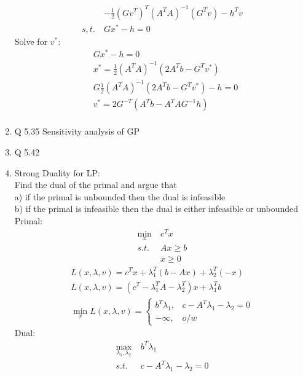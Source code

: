 \documentclass[12pt,letter]{article}
\begin{document}
\begin{enumerate}
\begin{align*}
    &-\frac{1}{2}(Gv^T)^T(A^TA)^{-1}(G^Tv) -h^Tv\\
    s,t.\ & Gx^*-h=0
  \end{align*}
  Solve for $v^*$:\\
  \begin{align*}
    &Gx^*-h=0\\
    &x^* = \frac{1}{2}(A^TA)^{-1}(2A^Tb - G^Tv^*)\\
    &G\frac{1}{2}(A^TA)^{-1}(2A^Tb - G^Tv^*)-h=0\\
    &v^*=2G^{-T}(A^Tb-A^TAG^{-1}h)\\
  \end{align*}
  \pagebreak
\item Q 5.35 Sensitivity analysis of GP\\
  \pagebreak
\item Q 5.42 \\
  \pagebreak
\item Strong Duality for LP:\\
  Find the dual of the primal and argue that \\
  a) if the primal is unbounded then the dual is infeasible\\
  b) if the primal is infeasible then the dual is either infeasible or unbounded\\
  
  Primal:
  \begin{align*}
    \min_x\ & c^Tx\\
    s.t.\ & Ax \geq b\\
           & x \geq 0
  \end{align*}
  \begin{align*}
    L(x,\lambda,v) = c^Tx + \lambda_1^T(b-Ax) + \lambda_2^T(-x)\\
    L(x,\lambda,v) = (c^T-\lambda_1^TA -\lambda_2^T)x + \lambda_1^Tb\\
    \min_x L(x,\lambda,v) =
    \begin{cases}
      b^T\lambda_1, & c -A^T\lambda_1-\lambda_2 = 0\\
      -\infty, & o/w
    \end{cases}
  \end{align*}
  Dual:
  \begin{align*}
    \max_{\lambda_1,\lambda_2}\ & b^T\lambda_1\\
    s.t.\ & c - A^T\lambda_1 - \lambda_2 = 0\\
  \end{align*}
  
\end{enumerate}
\end{document}
